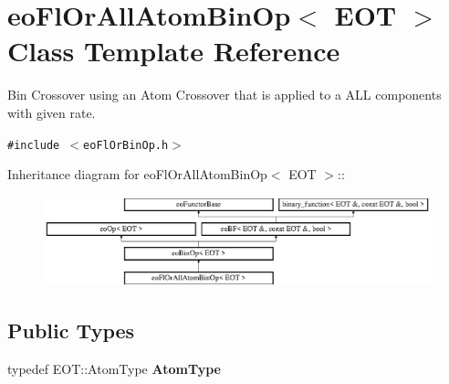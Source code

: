\section{eo\-Fl\-Or\-All\-Atom\-Bin\-Op$<$ EOT $>$ Class Template Reference}
\label{classeo_fl_or_all_atom_bin_op}
Bin Crossover using an Atom Crossover that is applied to a ALL components with given rate.  


{\tt \#include $<$eo\-Fl\-Or\-Bin\-Op.h$>$}

Inheritance diagram for eo\-Fl\-Or\-All\-Atom\-Bin\-Op$<$ EOT $>$::\begin{figure}[H]
\begin{center}
\leavevmode
\includegraphics[height=2.60163cm]{classeo_fl_or_all_atom_bin_op}
\end{center}
\end{figure}
\subsection*{Public Types}
\begin{CompactItemize}
\item 
typedef EOT::Atom\-Type {\bf Atom\-Type}\label{classeo_fl_or_all_atom_bin_op_w0}

\end{CompactItemize}
